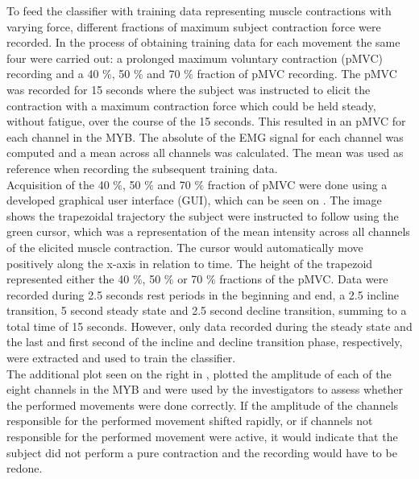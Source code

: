 To feed the classifier with training data representing muscle contractions with varying force, different fractions of maximum subject contraction force were recorded. In the process of obtaining training data for each movement the same four were carried out: a prolonged maximum voluntary contraction (pMVC) recording and a 40 $\percent$, 50 $\percent$ and 70 $\percent$ fraction of pMVC recording.
The pMVC was recorded for 15 seconds where the subject was instructed to elicit the contraction with a maximum contraction force which could be held steady, without fatigue, over the course of the 15 seconds. This resulted in an pMVC for each channel in the MYB. The absolute of the EMG signal for each channel was computed and a mean across all channels was calculated. The mean was used as reference when recording the subsequent training data. \\
Acquisition of the 40 $\percent$, 50 $\percent$ and 70 $\percent$ fraction of pMVC were done using a developed graphical user interface (GUI), which can be seen on . The image shows the trapezoidal trajectory the subject were instructed to follow using the green cursor, which was a representation of the mean intensity across all channels of the elicited muscle contraction. The cursor would automatically move positively along the x-axis in relation to time. The height of the trapezoid represented either the 40 $\percent$, 50 $\percent$ or 70 $\percent$ fractions of the pMVC. Data were recorded during 2.5 seconds rest periods in the beginning and end, a 2.5 incline transition, 5 second steady state and 2.5 second decline transition, summing to a total time of 15 seconds. However, only data recorded during the steady state and the last and first second of the incline and decline transition phase, respectively, were extracted and used to train the classifier. \\
The additional plot seen on the right in , plotted the amplitude of each of the eight channels in the MYB and were used by the investigators to assess whether the performed movements were done correctly. If the amplitude of the channels responsible for the performed movement shifted rapidly, or if channels not responsible for the performed movement were active, it would indicate that the subject did not perform a pure contraction and the recording would have to be redone.   
   
   
